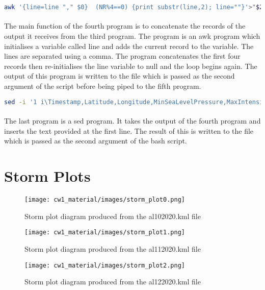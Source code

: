 \documentclass[]{article}
\begin{document}
\begin{lstlisting}[language=Bash, caption = Fourth program]
awk '{line=line "," $0}  (NR%4==0) {print substr(line,2); line=""}'>"$2" 
\end{lstlisting}
\paragraph{}The main function of the fourth program is to concatenate the records of the output it receives from the third program. The program is an awk program which initialises a variable called line and adds the current record to the variable. The lines are separated using a comma. The program concatenates the first four records then re-initialises the line variable to null and the loop begins again. The output of this program is written to the file which is passed as the second argument of the script before being piped to the fifth program.

\begin{lstlisting}[language=Bash, caption = Fifth program]
sed -i '1 i\Timestamp,Latitude,Longitude,MinSeaLevelPressure,MaxIntensity' "$2"
\end{lstlisting}
\paragraph{}The last program is a sed program. It takes the output of the fourth program and inserts the text provided at the first line. The result of this is written to the file which is passed as the second argument of the bash script.


\section{Storm Plots}

\begin{figure}
    \centering
    \texttt{[image: cw1\_material/images/storm\_plot0.png]}
    \caption{Storm plot diagram produced from the al102020.kml file}
    \label{fig:storm_plot1}
\end{figure}

\begin{figure}
    \centering
    \texttt{[image: cw1\_material/images/storm\_plot1.png]}
    \caption{Storm plot diagram produced from the al112020.kml file}
    \label{fig:storm_plot2}
\end{figure}

\begin{figure}
    \centering
    \texttt{[image: cw1\_material/images/storm\_plot2.png]}
    \caption{Storm plot diagram produced from the al122020.kml file}
    \label{fig:storm_plot3}
\end{figure}
\end{document}
